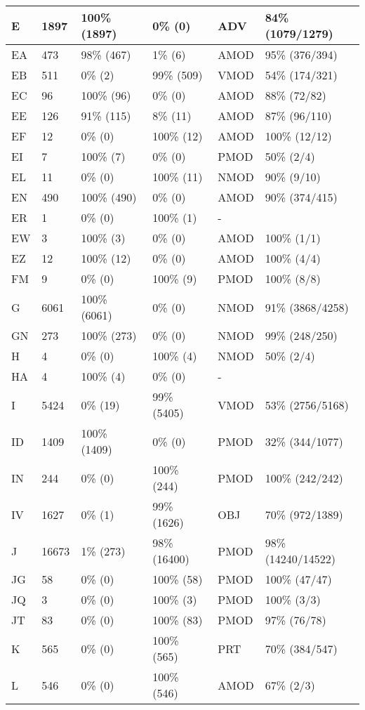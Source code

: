 \begin{figure*}
\begin{tabular}{|l|l|l|l||l|l|}
\hline
 E & 1897 & 100\% (1897) & 0\% (0) & ADV & 84\% (1079/1279) \\ 
\hline
 EA & 473 & 98\% (467) & 1\% (6) & AMOD & 95\% (376/394) \\ 
\hline
 EB & 511 & 0\% (2) & 99\% (509) & VMOD & 54\% (174/321) \\ 
\hline
 EC & 96 & 100\% (96) & 0\% (0) & AMOD & 88\% (72/82) \\ 
\hline
 EE & 126 & 91\% (115) & 8\% (11) & AMOD & 87\% (96/110) \\ 
\hline
 EF & 12 & 0\% (0) & 100\% (12) & AMOD & 100\% (12/12) \\ 
\hline
 EI & 7 & 100\% (7) & 0\% (0) & PMOD & 50\% (2/4) \\ 
\hline
 EL & 11 & 0\% (0) & 100\% (11) & NMOD & 90\% (9/10) \\ 
\hline
 EN & 490 & 100\% (490) & 0\% (0) & AMOD & 90\% (374/415) \\ 
\hline
 ER & 1 & 0\% (0) & 100\% (1) & - &  \\ 
\hline
 EW & 3 & 100\% (3) & 0\% (0) & AMOD & 100\% (1/1) \\ 
\hline
 EZ & 12 & 100\% (12) & 0\% (0) & AMOD & 100\% (4/4) \\ 
\hline
 FM & 9 & 0\% (0) & 100\% (9) & PMOD & 100\% (8/8) \\ 
\hline
 G & 6061 & 100\% (6061) & 0\% (0) & NMOD & 91\% (3868/4258) \\ 
\hline
 GN & 273 & 100\% (273) & 0\% (0) & NMOD & 99\% (248/250) \\ 
\hline
 H & 4 & 0\% (0) & 100\% (4) & NMOD & 50\% (2/4) \\ 
\hline
 HA & 4 & 100\% (4) & 0\% (0) & - &  \\ 
\hline
 I & 5424 & 0\% (19) & 99\% (5405) & VMOD & 53\% (2756/5168) \\ 
\hline
 ID & 1409 & 100\% (1409) & 0\% (0) & PMOD & 32\% (344/1077) \\ 
\hline
 IN & 244 & 0\% (0) & 100\% (244) & PMOD & 100\% (242/242) \\ 
\hline
 IV & 1627 & 0\% (1) & 99\% (1626) & OBJ & 70\% (972/1389) \\ 
\hline
 J & 16673 & 1\% (273) & 98\% (16400) & PMOD & 98\% (14240/14522) \\ 
\hline
 JG & 58 & 0\% (0) & 100\% (58) & PMOD & 100\% (47/47) \\ 
\hline
 JQ & 3 & 0\% (0) & 100\% (3) & PMOD & 100\% (3/3) \\ 
\hline
 JT & 83 & 0\% (0) & 100\% (83) & PMOD & 97\% (76/78) \\ 
\hline
 K & 565 & 0\% (0) & 100\% (565) & PRT & 70\% (384/547) \\ 
\hline
 L & 546 & 0\% (0) & 100\% (546) & AMOD & 67\% (2/3) \\ 
\hline
\end{tabular}
\end{figure*}
